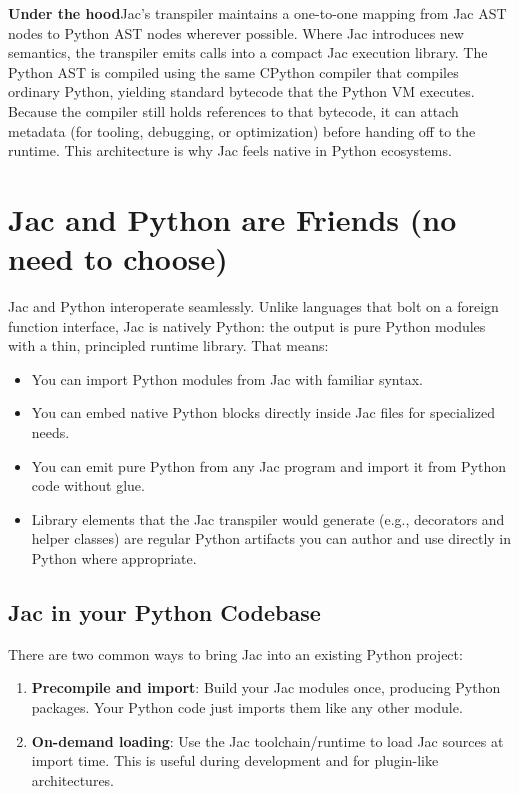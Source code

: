 \begin{nerd}
\textbf{Under the hood}\quad Jac's transpiler maintains a one-to-one mapping from Jac AST nodes to Python AST nodes wherever possible. Where Jac introduces new semantics, the transpiler emits calls into a compact Jac execution library. The Python AST is compiled using the same CPython compiler that compiles ordinary Python, yielding standard bytecode that the Python VM executes. Because the compiler still holds references to that bytecode, it can attach metadata (for tooling, debugging, or optimization) before handing off to the runtime. This architecture is why Jac feels native in Python ecosystems.
\end{nerd}

\section{Jac and Python are Friends (no need to choose)}
Jac and Python interoperate seamlessly. Unlike languages that bolt on a foreign function interface, Jac is natively Python: the output is pure Python modules with a thin, principled runtime library. That means:

\begin{itemize}
    \item You can import Python modules from Jac with familiar syntax.
    \item You can embed native Python blocks directly inside Jac files for specialized needs.
    \item You can emit pure Python from any Jac program and import it from Python code without glue.
    \item Library elements that the Jac transpiler would generate (e.g., decorators and helper classes) are regular Python artifacts you can author and use directly in Python where appropriate.
\end{itemize}

\subsection{Jac in your Python Codebase}
There are two common ways to bring Jac into an existing Python project:

\begin{enumerate}
    \item \textbf{Precompile and import}: Build your Jac modules once, producing Python packages. Your Python code just imports them like any other module.
    \item \textbf{On-demand loading}: Use the Jac toolchain/runtime to load Jac sources at import time. This is useful during development and for plugin-like architectures.
\end{enumerate}

